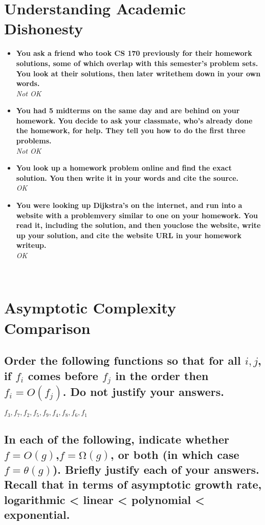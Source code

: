 \documentclass[11pt]{article}
\begin{document}
\section{Understanding Academic Dishonesty}
\label{sec:org668d98e}
\begin{itemize}
\item \textbf{You ask a friend who took CS 170 previously for their homework solutions, some of which overlap with this semester’s problem sets. You look at their solutions, then later writethem down in your own words.}\\
\emph{Not OK}\\
\item \textbf{You had 5 midterms on the same day and are behind on your homework. You decide to ask your classmate, who’s already done the homework, for help.  They tell you how to do the first three problems.}\\
\emph{Not OK}\\
\item \textbf{You look up a homework problem online and find the exact solution. You then write it in your words and cite the source.}\\
\emph{OK}\\
\item \textbf{You were looking up Dijkstra’s on the internet, and run into a website with a problemvery similar to one on your homework. You read it, including the solution, and then youclose the website, write up your solution, and cite the website URL in your homework writeup.}\\
\emph{OK}\\
\end{itemize}
\newpage\\
\section{Asymptotic Complexity Comparison}
\label{sec:org421d4aa}
\subsection{Order the following functions so that for all \(i,j\), if \(f_i\) comes before \(f_j\) in the order then \(f_i=O(f_j)\). Do not justify your answers.}
\label{sec:org2f70b9d}
\(f_3, f_7, f_2, f_5, f_9, f_4, f_8, f_6, f_1\)\\
\subsection{In each of the following, indicate whether \(f=O(g)\),\(f= Ω(g)\), or both (in which case \(f= \theta(g)\)). Briefly justify each of your answers.  Recall that in terms of asymptotic growth rate, logarithmic < linear < polynomial < exponential.}
\label{sec:orgb1220e7}
\end{document}
